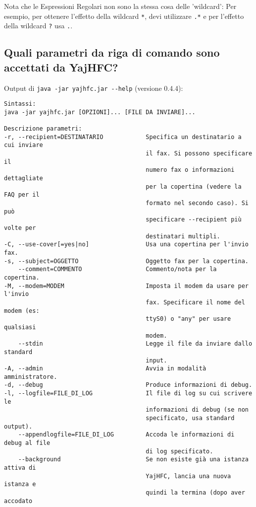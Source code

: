 \documentclass[a4paper,10pt]{scrartcl}
\begin{document}
Nota che le Espressioni Regolari non sono la stessa cosa delle 'wildcard': 
Per esempio, per ottenere l'effetto della wildcard \verb.*., devi utilizzare \verb#.*# e 
per l'effetto della wildcard \verb#?# usa \verb#.#.

\subsection{Quali parametri da riga di comando sono accettati da YajHFC?}

Output di \verb#java -jar yajhfc.jar --help# (versione 0.4.4):
\begin{verbatim}
Sintassi:
java -jar yajhfc.jar [OPZIONI]... [FILE DA INVIARE]...

Descrizione parametri:
-r, --recipient=DESTINATARIO            Specifica un destinatario a cui inviare
                                        il fax. Si possono specificare il
                                        numero fax o informazioni dettagliate
                                        per la copertina (vedere la FAQ per il
                                        formato nel secondo caso). Si può
                                        specificare --recipient più volte per
                                        destinatari multipli.
-C, --use-cover[=yes|no]                Usa una copertina per l'invio fax.
-s, --subject=OGGETTO                   Oggetto fax per la copertina.
    --comment=COMMENTO                  Commento/nota per la copertina.
-M, --modem=MODEM                       Imposta il modem da usare per l'invio
                                        fax. Specificare il nome del modem (es:
                                        ttyS0) o "any" per usare qualsiasi
                                        modem.
    --stdin                             Legge il file da inviare dallo standard
                                        input.
-A, --admin                             Avvia in modalità amministratore.
-d, --debug                             Produce informazioni di debug.
-l, --logfile=FILE_DI_LOG               Il file di log su cui scrivere le
                                        informazioni di debug (se non
                                        specificato, usa standard output).
    --appendlogfile=FILE_DI_LOG         Accoda le informazioni di debug al file
                                        di log specificato.
    --background                        Se non esiste già una istanza attiva di
                                        YajHFC, lancia una nuova istanza e
                                        quindi la termina (dopo aver accodato

\end{verbatim}
\end{document}
